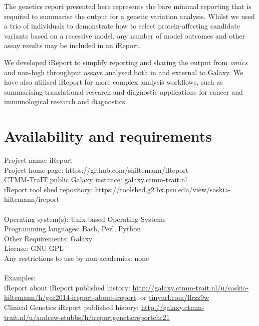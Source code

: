 The genetics report presented here represents the bare minimal reporting that is required to summarise the output for a genetic variation analysis. Whilst we used a trio of individuals to demonstrate how to select protein-affecting candidate variants based on a recessive model, any number of model outcomes and other assay results may be included in an iReport.

We developed iReport to simplify reporting and sharing the output from \emph{omics} and non-high throughput assays analysed both in and external to Galaxy. We have also utilised iReport for more complex analysis workflows, such as summarising translational research and diagnostic applications for cancer and immunological research and diagnostics.

\section*{Availability and requirements}
Project name: iReport \\
Project home page: https://github.com/shiltemann/iReport \\
CTMM-TraIT public Galaxy instance: galaxy.ctmm-trait.nl \\
iReport tool shed repository: https://toolshed.g2.bx.psu.edu/view/saskia-hiltemann/ireport \\
\ \\
Operating system(s): Unix-based Operating Systems \\
Programming languages: Bash, Perl, Python \\
Other Requirements: Galaxy \\
License: GNU GPL \\
Any restrictions to use by non-academics: none \\
\ \\
Examples: \\
iReport about iReport published history: \url{http://galaxy.ctmm-trait.nl/u/saskia-hiltemann/h/gcc2014-ireport-about-ireport}, or \url{tinyurl.com/llrzz9w} \\
Clinical Genetics iReport published history: \url{http://galaxy.ctmm-trait.nl/u/andrew-stubbs/h/ireportgeneticreportchr21} \\


